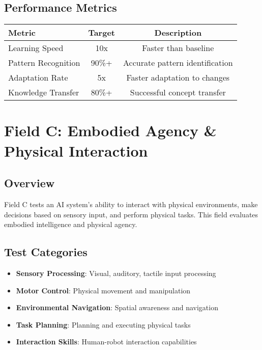 \documentclass[12pt,a4paper]{article}
\begin{document}
\subsection{Performance Metrics}
\begin{center}
\begin{tabular}{|l|c|c|}
\hline
\textbf{Metric} & \textbf{Target} & \textbf{Description} \\
\hline
Learning Speed & 10x & Faster than baseline \\
Pattern Recognition & 90\%+ & Accurate pattern identification \\
Adaptation Rate & 5x & Faster adaptation to changes \\
Knowledge Transfer & 80\%+ & Successful concept transfer \\
\hline
\end{tabular}
\end{center}

\newpage

\section{Field C: Embodied Agency \& Physical Interaction}

\subsection{Overview}
Field C tests an AI system's ability to interact with physical environments, make decisions based on sensory input, and perform physical tasks. This field evaluates embodied intelligence and physical agency.

\subsection{Test Categories}
\begin{itemize}
    \item \textbf{Sensory Processing}: Visual, auditory, tactile input processing
    \item \textbf{Motor Control}: Physical movement and manipulation
    \item \textbf{Environmental Navigation}: Spatial awareness and navigation
    \item \textbf{Task Planning}: Planning and executing physical tasks
    \item \textbf{Interaction Skills}: Human-robot interaction capabilities
\end{itemize}
\end{document}
